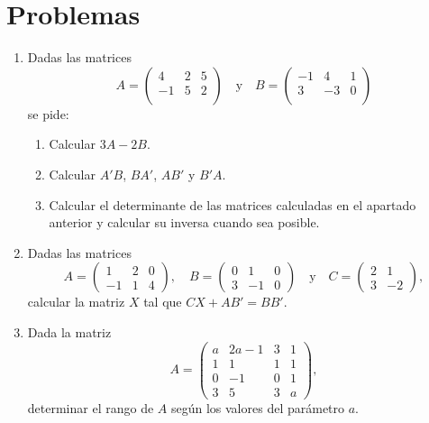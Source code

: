 \documentclass[a4paper]{article}
\begin{document}
\section*{Problemas}
\begin{enumerate}[leftmargin=*]
\item Dadas las matrices
\[
A=\left(
\begin{array}{rrc}
  4 & 2 & 5 \\
 -1 & 5 & 2 \\
\end{array}
\right) \quad \textrm{y} \quad
B=\left(
\begin{array}{rrc}
 -1 &  4 & 1 \\
  3 & -3 & 0 \\
\end{array}
\right)
\]
se pide:
\begin{enumerate}
\item Calcular $3A-2B$.
\item Calcular $A'B$, $BA'$, $AB'$ y $B'A$.
\item Calcular el determinante de las matrices calculadas en el apartado anterior y calcular su inversa cuando sea posible.
\end{enumerate}




\item  Dadas las matrices
\[
A=\left(
\begin{array}{rrr}
1 & 2 & 0 \\ -1 & 1 & 4
\end{array}
\right) ,\quad
B=\left(
\begin{array}{rrr}
0 & 1 & 0 \\ 3 & -1 & 0
\end{array}
\right) \quad \mbox{y}\quad
C=\left(
\begin{array}{rr}
2 & 1 \\ 3 & -2
\end{array}
\right) , \]
calcular la matriz $X$ tal que $CX+AB'=BB'.$

\item  Dada la matriz
\[
A=\left(
\begin{array}{cccc}
a & 2a-1 & 3 & 1 \\ 1 & 1 & 1 & 1 \\ 0 & -1 & 0 & 1 \\ 3 & 5 & 3 & a
\end{array}
\right) , \]
determinar el rango de $A$ según los valores del parámetro $a$.


\end{enumerate}
\end{document}
